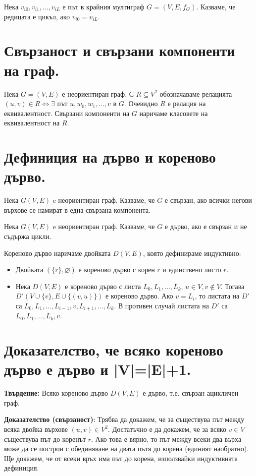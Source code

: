 \documentclass[fleqn,12pt]{article}
\begin{document}
\begin{flushleft}
Нека $v_{i0}, v_{i1}, \dots, v_{iL}$ е път в крайния мултиграф $G = (V, E, f_G)$.
Казваме, че редицата е цикъл, ако $v_{i0} = v_{iL}$.

\section{Свързаност и свързани компоненти на граф.} 

Нека $G = (V, E)$ е неориентиран граф. 
С $R \subseteq V^2$ обозначаваме релацията $ (u, v) \in R \Leftrightarrow \exists $ път $u, w_0, w_1, \dots, v$ в $G$.
Очевидно $R$ е релация на еквивалентност. Свързани компоненти на $G$ наричаме класовете на еквивалентност на $R$.

\section{Дефиниция на дърво и кореново дърво.}

Нека $G(V, E)$ e неориентиран граф. Казваме, че $G$ е свързан, ако всички негови върхове
се намират в една свързана компонента.
\vspace{10mm}

Нека $G(V, E)$ e неориентиран граф. Казваме, че $G$ е дърво, ако е свързан и не съдържа цикли.
\vspace{10mm}

Кореново дърво наричаме двойката $D(V, E)$, която дефинираме индуктивно:
\begin{itemize}
	\item Двойката $(\{r\}, \varnothing)$ е кореново дърво с корен $r$ и единствено листо $r$.
	\item Нека $D(V,E)$ е кореново дърво с листа $L_0, L_1, \dots, L_k$, $u \in V, v \notin V$. Тогава $D'(V \cup \{v\}, E \cup \{ (v, u)\})$ е кореново дърво.
	Ако $v = L_i$, то листата на $D'$ са $L_0, L_1, \dots, L_{i-1}, v, L_{i+1}, \dots, L_k$. В противен случай листата на $D'$ са 
	$L_0, L_1, \dots, L_k, v$.
\end{itemize}

\section{Доказателство, че всяко кореново дърво е дърво и |V|=|E|+1.}
\textbf{Твърдение:} Всяко кореново дърво $D(V,E)$ е дърво, т.е. свързан ацикличен граф.

\textbf{Доказателство (свързаност)}: Трябва да докажем, че за съществува път между всяка двойка върхове $(u, v) \in V^2$. Достатъчно е да докажем, че 
за всяко $v \in V$ съществува път до коренът $r$. Ако това е вярно, то път между всеки два върха може да се построи с обединяване на двата пътя до корена 
(единият наобратно). Ще докажем, че от всеки връх има път до корена, използвайки индуктивната дефиниция.


\end{flushleft}
\end{document}
